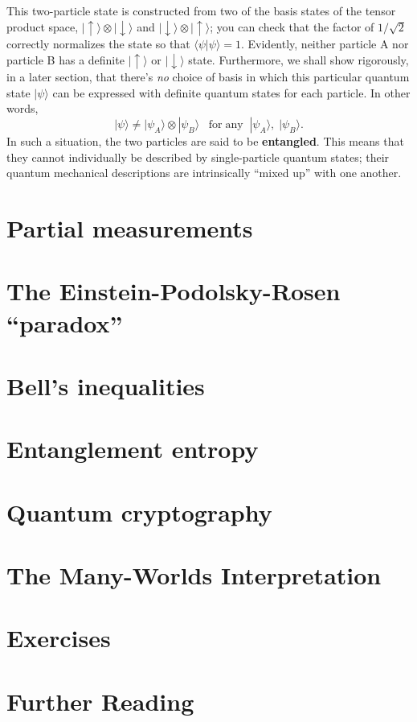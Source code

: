 \documentclass[pra,11pt]{revtex4}
\begin{document}
This two-particle state is constructed from two of the basis states of
the tensor product space,
$|\!\uparrow\rangle\otimes|\!\downarrow\rangle$ and
$|\!\downarrow\rangle\otimes|\!\uparrow\rangle$; you can check that
the factor of $1/\sqrt{2}$ correctly normalizes the state so that
$\langle\psi|\psi\rangle = 1$.  Evidently, neither particle A nor
particle B has a definite $|\!\uparrow\rangle$ or
$|\!\downarrow\rangle$ state.  Furthermore, we shall show rigorously,
in a later section, that there's \textit{no} choice of basis in which this
particular quantum state $|\psi\rangle$ can be expressed with
definite quantum states for each particle.  In other words,
$$|\psi\rangle \ne |\psi_A\rangle\otimes|\psi_B\rangle \;\;\;\textrm{for}\;\textrm{any}\;\; |\psi_A\rangle, \;|\psi_B\rangle.$$
In such a situation, the two particles are said to be
\textbf{entangled}.  This means that they cannot individually be
described by single-particle quantum states; their quantum
mechanical descriptions are intrinsically ``mixed up'' with one another.


\section{Partial measurements}

\section{The Einstein-Podolsky-Rosen ``paradox''}


\section{Bell's inequalities}

\section{Entanglement entropy}

\section{Quantum cryptography}

\section{The Many-Worlds Interpretation}

\section{Exercises}






\section{Further Reading}


\end{document}
